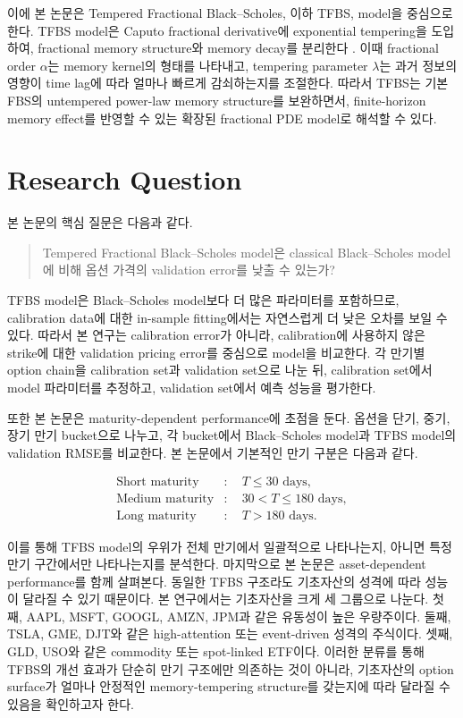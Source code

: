 \documentclass[11pt,a4paper]{report}
\begin{document}
이에 본 논문은 Tempered Fractional Black--Scholes, 이하 TFBS, model을 중심으로 한다.
TFBS model은 Caputo fractional derivative에 exponential tempering을 도입하여,
fractional memory structure와 memory decay를 분리한다 \cite{SabzikarMeerschaertChen2015}.
이때 fractional order $\alpha$는 memory kernel의 형태를 나타내고,
tempering parameter $\lambda$는 과거 정보의 영향이 time lag에 따라 얼마나 빠르게 감쇠하는지를 조절한다.
따라서 TFBS는 기본 FBS의 untempered power-law memory structure를 보완하면서,
finite-horizon memory effect를 반영할 수 있는 확장된 fractional PDE model로 해석할 수 있다.
\section{Research Question}

본 논문의 핵심 질문은 다음과 같다.

\begin{quote}
Tempered Fractional Black--Scholes model은 classical Black--Scholes model에 비해 옵션 가격의 validation error를 낮출 수 있는가?
\end{quote}

TFBS model은 Black--Scholes model보다 더 많은 파라미터를 포함하므로, calibration data에 대한 in-sample fitting에서는 자연스럽게 더 낮은 오차를 보일 수 있다. 따라서 본 연구는 calibration error가 아니라, calibration에 사용하지 않은 strike에 대한 validation pricing error를 중심으로 model을 비교한다. 각 만기별 option chain을 calibration set과 validation set으로 나눈 뒤, calibration set에서 model 파라미터를 추정하고, validation set에서 예측 성능을 평가한다.

또한 본 논문은 maturity-dependent performance에 초점을 둔다. 옵션을 단기, 중기, 장기 만기 bucket으로 나누고, 각 bucket에서 Black--Scholes model과 TFBS model의 validation RMSE를 비교한다. 본 논문에서 기본적인 만기 구분은 다음과 같다.

\begin{align*}
\text{Short maturity} &:\quad T \leq 30 \text{ days}, \\
\text{Medium maturity} &:\quad 30 < T \leq 180 \text{ days}, \\
\text{Long maturity} &:\quad T > 180 \text{ days}.
\end{align*}

이를 통해 TFBS model의 우위가 전체 만기에서 일괄적으로 나타나는지, 아니면 특정 만기 구간에서만 나타나는지를 분석한다. 마지막으로 본 논문은 asset-dependent performance를 함께 살펴본다. 동일한 TFBS 구조라도 기초자산의 성격에 따라 성능이 달라질 수 있기 때문이다. 본 연구에서는 기초자산을 크게 세 그룹으로 나눈다. 첫째, AAPL, MSFT, GOOGL, AMZN, JPM과 같은 유동성이 높은 우량주이다. 둘째, TSLA, GME, DJT와 같은 high-attention 또는 event-driven 성격의 주식이다. 셋째, GLD, USO와 같은 commodity 또는 spot-linked ETF이다. 이러한 분류를 통해 TFBS의 개선 효과가 단순히 만기 구조에만 의존하는 것이 아니라, 기초자산의 option surface가 얼마나 안정적인 memory-tempering structure를 갖는지에 따라 달라질 수 있음을 확인하고자 한다.
\end{document}
